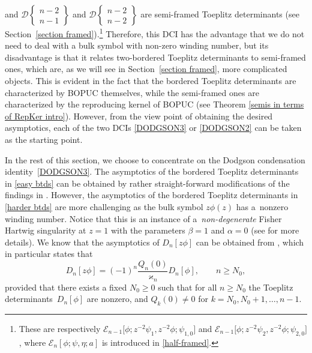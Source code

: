 \documentclass[pdftex]{sigma}
\numberwithin{equation}{section}
\newcommand{\al}{\alpha}
\newcommand{\be}{\beta}
\begin{document}
\begin{Remark}
		and $\mathscr{D}\left\lbrace \begin{smallmatrix} n-2 \\ n-1 \end{smallmatrix} \right\rbrace$ and $ \mathscr{D}\left\lbrace \begin{smallmatrix} n-2 \\ n-2 \end{smallmatrix} \right\rbrace$ are semi-framed Toeplitz determinants (see Section~\ref{section framed}).\footnote{These are respectively $\mathscr{E}_{n-1}\big[\phi;z^{-2}\psi_1,z^{-2}\phi;\psi_{1,0}\big]$ and $\mathscr{E}_{n-1}\big[\phi;z^{-2}\psi_2,z^{-2}\phi;\psi_{2,0}\big]$, where $\mathscr{E}_n[\phi;\psi,\eta;a]$ is introduced in \eqref{half-framed}.}	Therefore, this DCI has the advantage that we do not need to deal with a bulk symbol with non-zero winding number, but its disadvantage is that it relates two-bordered Toeplitz determinants to semi-framed ones, which are, as we will see in Section~\ref{section framed}, more complicated objects. This is evident in the fact that the bordered Toeplitz determinants are characterized by BOPUC themselves, while the semi-framed ones are characterized by the reproducing kernel of BOPUC (see Theorem \ref{semis in terms of RepKer intro}). However, from the view point of obtaining the desired asymptotics, each of the two DCIs \eqref{DODGSON3} or \eqref{DODGSON2} can be taken as the starting point.
\end{Remark}
	
In the rest of this section, we choose to concentrate on the Dodgson condensation identity~\eqref{DODGSON3}. The asymptotics of the bordered Toeplitz determinants in \eqref{easy btds} can be obtained by rather straight-forward modifications of the findings in \cite{BEGIL}. However, the asymptotics of the bordered Toeplitz determinants in \eqref{harder btds} are more challenging as the bulk symbol $z \phi(z)$ has a~nonzero winding number. Notice that this is an instance of a~\textit{non-degenerate} Fisher Hartwig singularity at $z=1$ with the parameters $\be=1$ and $\al=0$ (see \cite{DIK} for more details). We know that the asymptotics of $D_n[z \phi]$ can be obtained from \cite[Lemma 2.4]{DIK}, which in particular states that
	\begin{equation}\label{DIK zphi}
		D_n[z \phi] = (-1)^n \frac{Q_n(0)}{\varkappa_n}D_n[\phi], \qquad n \geq N_0,
	\end{equation}
	provided that there exists a fixed $N_0 \geq 0$ such that for all $n \geq N_0$ the Toeplitz determinants~$D_n[\phi]$ are nonzero, and $Q_k(0) \neq 0$ for $k=N_0, N_0+1, \dots, n-1$.
	
\end{document}

